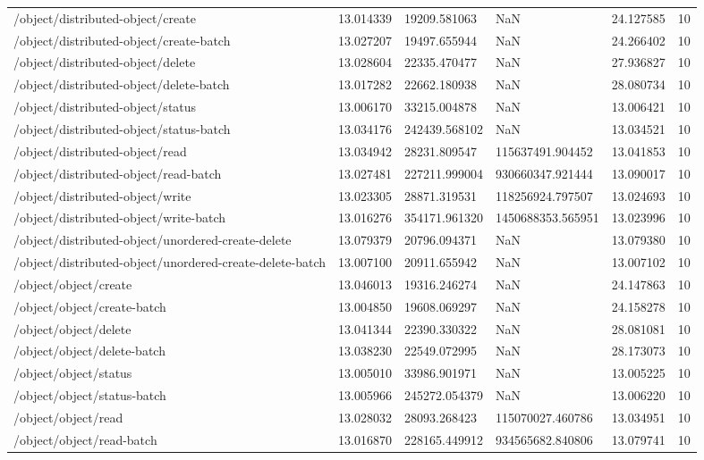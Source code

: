 \begin{tabularx}{\linewidth}{XXXXXX}
/object/distributed-object/create & 13.014339 & 19209.581063 & NaN & 24.127585 & 10 \\
/object/distributed-object/create-batch & 13.027207 & 19497.655944 & NaN & 24.266402 & 10 \\
/object/distributed-object/delete & 13.028604 & 22335.470477 & NaN & 27.936827 & 10 \\
/object/distributed-object/delete-batch & 13.017282 & 22662.180938 & NaN & 28.080734 & 10 \\
/object/distributed-object/status & 13.006170 & 33215.004878 & NaN & 13.006421 & 10 \\
/object/distributed-object/status-batch & 13.034176 & 242439.568102 & NaN & 13.034521 & 10 \\
/object/distributed-object/read & 13.034942 & 28231.809547 & 115637491.904452 & 13.041853 & 10 \\
/object/distributed-object/read-batch & 13.027481 & 227211.999004 & 930660347.921444 & 13.090017 & 10 \\
/object/distributed-object/write & 13.023305 & 28871.319531 & 118256924.797507 & 13.024693 & 10 \\
/object/distributed-object/write-batch & 13.016276 & 354171.961320 & 1450688353.565951 & 13.023996 & 10 \\
/object/distributed-object/unordered-create-delete & 13.079379 & 20796.094371 & NaN & 13.079380 & 10 \\
/object/distributed-object/unordered-create-delete-batch & 13.007100 & 20911.655942 & NaN & 13.007102 & 10 \\
/object/object/create & 13.046013 & 19316.246274 & NaN & 24.147863 & 10 \\
/object/object/create-batch & 13.004850 & 19608.069297 & NaN & 24.158278 & 10 \\
/object/object/delete & 13.041344 & 22390.330322 & NaN & 28.081081 & 10 \\
/object/object/delete-batch & 13.038230 & 22549.072995 & NaN & 28.173073 & 10 \\
/object/object/status & 13.005010 & 33986.901971 & NaN & 13.005225 & 10 \\
/object/object/status-batch & 13.005966 & 245272.054379 & NaN & 13.006220 & 10 \\
/object/object/read & 13.028032 & 28093.268423 & 115070027.460786 & 13.034951 & 10 \\
/object/object/read-batch & 13.016870 & 228165.449912 & 934565682.840806 & 13.079741 & 10 \\

\end{tabularx}
